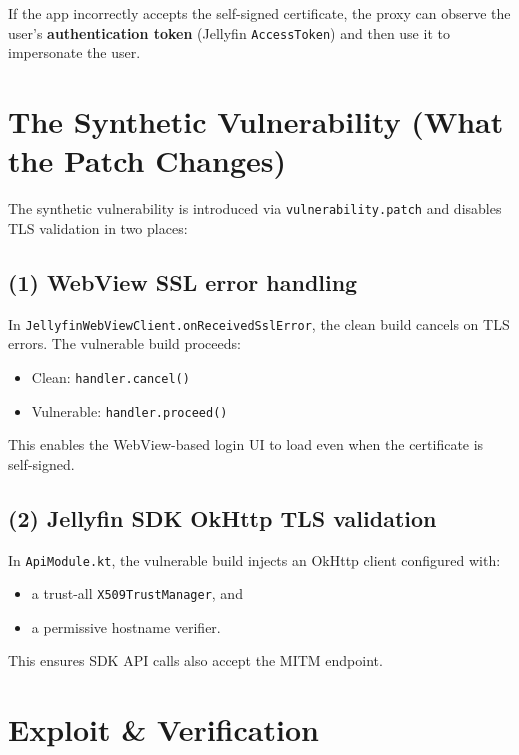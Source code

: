 \documentclass[11pt]{article}
\begin{document}
If the app incorrectly accepts the self-signed certificate, the proxy can observe the user's \textbf{authentication token} (Jellyfin \texttt{AccessToken}) and then use it to impersonate the user.

\section{The Synthetic Vulnerability (What the Patch Changes)}

The synthetic vulnerability is introduced via \texttt{vulnerability.patch} and disables TLS validation in two places:

\subsection*{(1) WebView SSL error handling}
In \texttt{JellyfinWebViewClient.onReceivedSslError}, the clean build cancels on TLS errors. The vulnerable build proceeds:
\begin{itemize}
  \item Clean: \texttt{handler.cancel()}
  \item Vulnerable: \texttt{handler.proceed()}
\end{itemize}

This enables the WebView-based login UI to load even when the certificate is self-signed.

\subsection*{(2) Jellyfin SDK OkHttp TLS validation}
In \texttt{ApiModule.kt}, the vulnerable build injects an OkHttp client configured with:
\begin{itemize}
  \item a trust-all \texttt{X509TrustManager}, and
  \item a permissive hostname verifier.
\end{itemize}

This ensures SDK API calls also accept the MITM endpoint.

\section{Exploit \& Verification}
\end{document}
